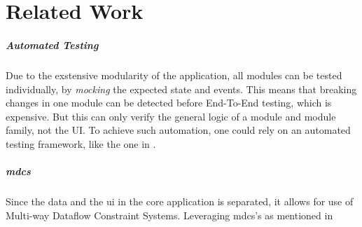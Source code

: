 \chapter{Related Work}

\paragraph{Automated Testing} Due to the exstensive modularity of the
application, all modules can be tested individually, by \textit{mocking} the
expected state and events. This means that breaking changes in one module can be
detected before End-To-End testing, which is expensive. 
But this can only verify the general logic of a module and module family, not
the UI. To achieve such automation, one could rely on an automated testing
framework, like the one in \cite{autoUi}.

\paragraph{\gls{mdcs}} Since the data and the \gls{ui}
in the core application is separated, it allows for use of Multi-way Dataflow
Constraint Systems. Leveraging \gls{mdcs}'s as mentioned in \cite{dslMdcs}

